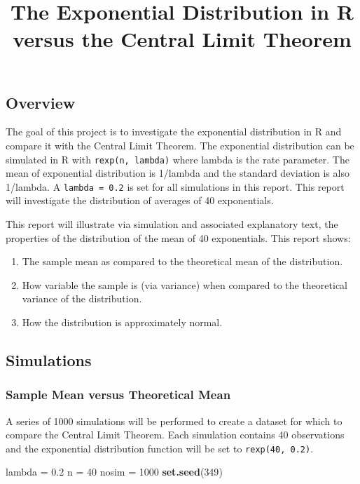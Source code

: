 \documentclass[]{article}
\title{The Exponential Distribution in R versus the Central Limit Theorem}
\author{}
\date{}
\newenvironment{Shaded}{\begin{snugshade}}{\end{snugshade}}
\newcommand{\KeywordTok}[1]{\textcolor[rgb]{0.13,0.29,0.53}{\textbf{{#1}}}}
\newcommand{\DecValTok}[1]{\textcolor[rgb]{0.00,0.00,0.81}{{#1}}}
\newcommand{\FloatTok}[1]{\textcolor[rgb]{0.00,0.00,0.81}{{#1}}}
\newcommand{\StringTok}[1]{\textcolor[rgb]{0.31,0.60,0.02}{{#1}}}
\newcommand{\NormalTok}[1]{{#1}}
\providecommand{\tightlist}{%
  \setlength{\itemsep}{0pt}\setlength{\parskip}{0pt}}
\begin{document}
\maketitle

\subsection{Overview}\label{overview}

The goal of this project is to investigate the exponential distribution
in R and compare it with the Central Limit Theorem. The exponential
distribution can be simulated in R with \texttt{rexp(n,\ lambda)} where
lambda is the rate parameter. The mean of exponential distribution is
1/lambda and the standard deviation is also 1/lambda. A
\texttt{lambda\ =\ 0.2} is set for all simulations in this report. This
report will investigate the distribution of averages of 40 exponentials.

This report will illustrate via simulation and associated explanatory
text, the properties of the distribution of the mean of 40 exponentials.
This report shows:

\begin{enumerate}
\def\labelenumi{\arabic{enumi}.}
\tightlist
\item
  The sample mean as compared to the theoretical mean of the
  distribution.
\item
  How variable the sample is (via variance) when compared to the
  theoretical variance of the distribution.
\item
  How the distribution is approximately normal.
\end{enumerate}

\subsection{Simulations}\label{simulations}

\subsubsection{Sample Mean versus Theoretical
Mean}\label{sample-mean-versus-theoretical-mean}

A series of 1000 simulations will be performed to create a dataset for
which to compare the Central Limit Theorem. Each simulation contains 40
observations and the exponential distribution function will be set to
\texttt{rexp(40,\ 0.2)}.

\begin{Shaded}
\begin{Highlighting}[]
\NormalTok{lambda =}\StringTok{ }\FloatTok{0.2}
\NormalTok{n =}\StringTok{ }\DecValTok{40} 
\NormalTok{nosim =}\StringTok{ }\DecValTok{1000}
\KeywordTok{set.seed}\NormalTok{(}\DecValTok{349}\NormalTok{)}
\end{Highlighting}
\end{Shaded}
\end{document}
